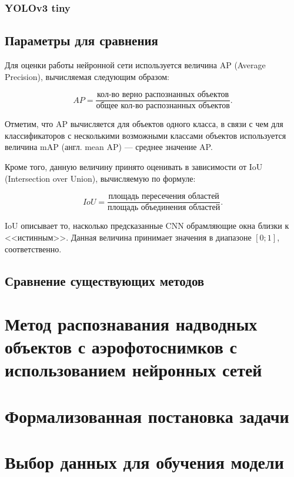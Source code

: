 \subsubsection{YOLOv3 tiny}

\subsection{Параметры для сравнения}

Для оценки работы нейронной сети используется величина AP (Average Precision), вычисляемая следующим образом:

\begin{equation}
	AP = \frac{\text{кол-во верно распознанных объектов}}{\text{общее кол-во распознанных объектов}}.
\end{equation}

Отметим, что AP вычисляется для объектов одного класса, в связи с чем для классификаторов с несколькими возможными классами объектов используется величина mAP (англ. mean AP) --- среднее значение AP.

Кроме того, данную величину принято оценивать в зависимости от IoU (Intersection over Union), вычисляемую по формуле:

\begin{equation}
	IoU = \frac{\text{площадь пересечения областей}}{\text{площадь объединения областей}}.
\end{equation}

IoU описывает то, насколько предсказанные CNN обрамляющие окна близки к <<истинным>>. Данная величина принимает значения в диапазоне $[0;1]$, соответственно.

\subsection{Сравнение существующих методов}

\section{Метод распознавания надводных объектов с аэрофотоснимков с использованием нейронных сетей}

\section{Формализованная постановка задачи}


\section{Выбор данных для обучения модели}

~\cite{kaggle-airbus}